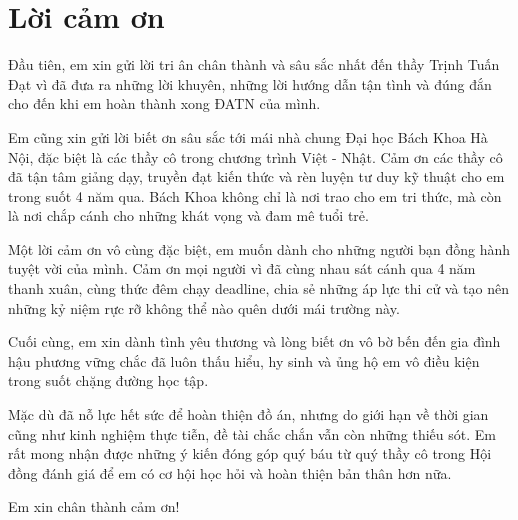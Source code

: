 \documentclass[../DoAn.tex]{subfiles}
\begin{document}
\chapter*{Lời cảm ơn}
Đầu tiên, em xin gửi lời tri ân chân thành và sâu sắc nhất đến thầy Trịnh Tuấn Đạt vì đã đưa ra những lời khuyên, những lời hướng dẫn tận tình và đúng đắn cho đến khi em hoàn thành xong ĐATN của mình.

Em cũng xin gửi lời biết ơn sâu sắc tới mái nhà chung Đại học Bách Khoa Hà Nội, đặc biệt là các thầy cô trong chương trình Việt - Nhật. Cảm ơn các thầy cô đã tận tâm giảng dạy, truyền đạt kiến thức và rèn luyện tư duy kỹ thuật cho em trong suốt 4 năm qua. Bách Khoa không chỉ là nơi trao cho em tri thức, mà còn là nơi chắp cánh cho những khát vọng và đam mê tuổi trẻ.

Một lời cảm ơn vô cùng đặc biệt, em muốn dành cho những người bạn đồng hành tuyệt vời của mình. Cảm ơn mọi người vì đã cùng nhau sát cánh qua 4 năm thanh xuân, cùng thức đêm chạy deadline, chia sẻ những áp lực thi cử và tạo nên những kỷ niệm rực rỡ không thể nào quên dưới mái trường này.

Cuối cùng, em xin dành tình yêu thương và lòng biết ơn vô bờ bến đến gia đình hậu phương vững chắc đã luôn thấu hiểu, hy sinh và ủng hộ em vô điều kiện trong suốt chặng đường học tập.

Mặc dù đã nỗ lực hết sức để hoàn thiện đồ án, nhưng do giới hạn về thời gian cũng như kinh nghiệm thực tiễn, đề tài chắc chắn vẫn còn những thiếu sót. Em rất mong nhận được những ý kiến đóng góp quý báu từ quý thầy cô trong Hội đồng đánh giá để em có cơ hội học hỏi và hoàn thiện bản thân hơn nữa.

Em xin chân thành cảm ơn!
\end{document}
